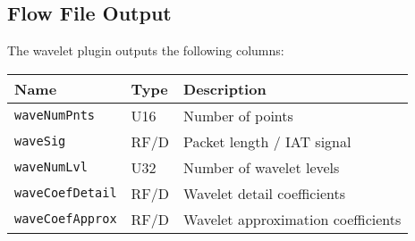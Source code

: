 \documentclass[documentation]{subfiles}
\begin{document}
\subsection{Flow File Output}
The wavelet plugin outputs the following columns:
\begin{longtable}{lll}
    \toprule
    {\bf Name} & {\bf Type} & {\bf Description}\\
    \midrule\endhead%
    {\tt waveNumPnts}    & U16  & Number of points \\
    {\tt waveSig}        & RF/D & Packet length / IAT signal \\
    {\tt waveNumLvl}     & U32  & Number of wavelet levels \\
    {\tt waveCoefDetail} & RF/D & Wavelet detail coefficients \\
    {\tt waveCoefApprox} & RF/D & Wavelet approximation coefficients \\
    \bottomrule
\end{longtable}



\end{document}
